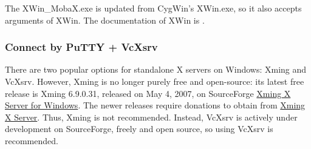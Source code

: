\documentclass[a4paper,12pt,twoside]{article}
\begin{document}
The XWin\_MobaX.exe is updated from CygWin's XWin.exe, so it also accepts arguments of XWin. The documentation of XWin is \cite{xwindoc}.
\subsubsection{Connect by PuTTY + VcXsrv}\label{S22}
There are two popular options for standalone X servers on Windows: Xming and VcXsrv. However, Xming is no longer purely free and open-source: its latest free release is Xming 6.9.0.31, released on May 4, 2007, on SourceForge \href{https://sourceforge.net/projects/xming/}{Xming X Server for Windows}. The newer releases require  donations to obtain from \href{http://www.straightrunning.com/XmingNotes/}{Xming X Server}. Thus, Xming is not recommended. Instead, VcXsrv is actively under development on SourceForge, freely and open source, so using VcXsrv is recommended.
\end{document}
